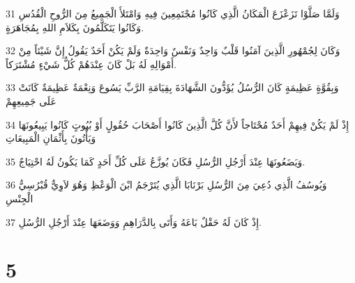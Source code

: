 \par 31 وَلَمَّا صَلَّوْا تَزَعْزَعَ الْمَكَانُ الَّذِي كَانُوا مُجْتَمِعِينَ فِيهِ وَامْتَلأَ الْجَمِيعُ مِنَ الرُّوحِ الْقُدُسِ وَكَانُوا يَتَكَلَّمُونَ بِكَلاَمِ اللهِ بِمُجَاهَرَةٍ.
\par 32 وَكَانَ لِجُمْهُورِ الَّذِينَ آمَنُوا قَلْبٌ وَاحِدٌ وَنَفْسٌ وَاحِدَةٌ وَلَمْ يَكُنْ أَحَدٌ يَقُولُ إِنَّ شَيْئاً مِنْ أَمْوَالِهِ لَهُ بَلْ كَانَ عِنْدَهُمْ كُلُّ شَيْءٍ مُشْتَرَكاً.
\par 33 وَبِقُوَّةٍ عَظِيمَةٍ كَانَ الرُّسُلُ يُؤَدُّونَ الشَّهَادَةَ بِقِيَامَةِ الرَّبِّ يَسُوعَ وَنِعْمَةٌ عَظِيمَةٌ كَانَتْ عَلَى جَمِيعِهِمْ
\par 34 إِذْ لَمْ يَكُنْ فِيهِمْ أَحَدٌ مُحْتَاجاً لأَنَّ كُلَّ الَّذِينَ كَانُوا أَصْحَابَ حُقُولٍ أَوْ بُيُوتٍ كَانُوا يَبِيعُونَهَا وَيَأْتُونَ بِأَثْمَانِ الْمَبِيعَاتِ
\par 35 وَيَضَعُونَهَا عِنْدَ أَرْجُلِ الرُّسُلِ فَكَانَ يُوزَّعُ عَلَى كُلِّ أَحَدٍ كَمَا يَكُونُ لَهُ احْتِيَاجٌ.
\par 36 وَيُوسُفُ الَّذِي دُعِيَ مِنَ الرُّسُلِ بَرْنَابَا الَّذِي يُتَرْجَمُ ابْنَ الْوَعْظِ وَهُوَ لاَوِيٌّ قُبْرُسِيُّ الْجِنْسِ
\par 37 إِذْ كَانَ لَهُ حَقْلٌ بَاعَهُ وَأَتَى بِالدَّرَاهِمِ وَوَضَعَهَا عِنْدَ أَرْجُلِ الرُّسُلِ.

\chapter{5}

